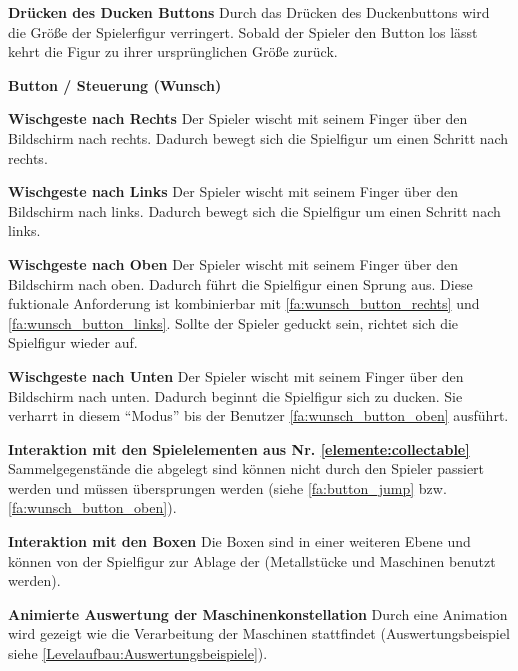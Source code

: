 \documentclass{scrartcl}
\begin{document}
\begin{falist}[resume]
\begin{falist}
    	\item \label{fa:button_ducken} \textbf{Drücken des Ducken Buttons} Durch das Drücken des Duckenbuttons wird die Größe der Spielerfigur verringert. Sobald der Spieler den Button los lässt kehrt die Figur zu ihrer ursprünglichen Größe zurück.
    \end{falist}
    \item \label{fa:button_wunsch} \textbf{Button / Steuerung (Wunsch)}
    \begin{falist}
    	\item \label{fa:wunsch_button_rechts} \textbf{Wischgeste nach Rechts} Der Spieler wischt mit seinem Finger über den Bildschirm nach rechts. Dadurch bewegt sich die Spielfigur um einen Schritt nach rechts.
    	\item \label{fa:wunsch_button_links} \textbf{Wischgeste nach Links} Der Spieler wischt mit seinem Finger über den Bildschirm nach links. Dadurch bewegt sich die Spielfigur um einen Schritt nach links.
    	\item \label{fa:wunsch_button_oben} \textbf{Wischgeste nach Oben} Der Spieler wischt mit seinem Finger über den Bildschirm nach oben. Dadurch führt die Spielfigur einen Sprung aus. Diese fuktionale Anforderung ist kombinierbar mit \ref{fa:wunsch_button_rechts} und \ref{fa:wunsch_button_links}. Sollte der Spieler geduckt sein, richtet sich die Spielfigur wieder auf.
    	\item \label{fa:wunsch_button_unten} \textbf{Wischgeste nach Unten} Der Spieler wischt mit seinem Finger über den Bildschirm nach unten. Dadurch beginnt die Spielfigur sich zu ducken. Sie verharrt in diesem \enquote{Modus} bis der Benutzer \ref{fa:wunsch_button_oben} ausführt.
    \end{falist}
	\item \textbf{Interaktion mit den Spielelementen aus Nr. \ref{elemente:collectable}} Sammelgegenstände die abgelegt sind können nicht durch den Spieler passiert werden und müssen übersprungen werden (siehe \ref{fa:button_jump} bzw. \ref{fa:wunsch_button_oben}).
	\item \textbf{Interaktion mit den Boxen} Die Boxen sind in einer weiteren Ebene und können von der Spielfigur zur Ablage der (Metallstücke und Maschinen benutzt werden).
	\item \label{fa:auswertung_animiert} \textbf{Animierte Auswertung der Maschinenkonstellation} Durch eine Animation wird gezeigt wie die Verarbeitung der Maschinen stattfindet (Auswertungsbeispiel siehe \ref{Levelaufbau:Auswertungsbeispiele}).
\end{falist}
\end{document}

